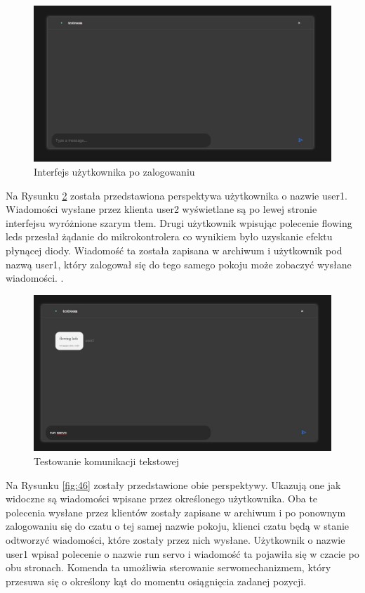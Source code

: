 \begin{figure}[htbp]
	\centering
	\includegraphics[width=0.5\linewidth]{"obrazy/TESTczatpodolaczeniu"}
	\caption{Interfejs użytkownika po zalogowaniu}
	\label{fig:42}
\end{figure}
Na Rysunku \ref{fig:44} została przedstawiona perspektywa użytkownika o nazwie user1. Wiadomości wysłane przez klienta user2 wyświetlane są po lewej stronie interfejsu wyróżnione szarym tłem. Drugi użytkownik wpisując polecenie flowing leds przesłał żądanie do mikrokontrolera co wynikiem było uzyskanie efektu płynącej diody. Wiadomość ta została zapisana w archiwum i użytkownik pod nazwą user1, który zalogował się do tego samego pokoju może zobaczyć wysłane wiadomości. 
\newpage.
\begin{figure}[htbp]
	\centering
	\includegraphics[width=0.5\linewidth]{"obrazy/TESTpisaniewiadomosci"}
	\caption{Testowanie komunikacji tekstowej}
	\label{fig:44}
\end{figure}

Na Rysunku \ref{fig:46} zostały przedstawione obie perspektywy. Ukazują one jak widoczne są wiadomości wpisane przez określonego użytkownika. Oba te polecenia wysłane przez klientów zostały zapisane w archiwum i po ponownym zalogowaniu się do czatu o tej samej nazwie pokoju, klienci czatu będą w stanie odtworzyć wiadomości, które zostały przez nich wysłane. Użytkownik o nazwie user1 wpisał polecenie o nazwie run servo i wiadomość ta pojawiła się w czacie po obu stronach. Komenda ta umożliwia sterowanie serwomechanizmem, który przesuwa się o określony kąt do momentu osiągnięcia zadanej pozycji.

